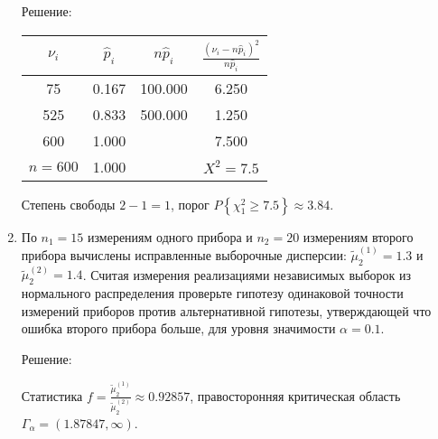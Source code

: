 \documentclass[a4paper,12pt]{article}
\newcommand{\probability}[1]{P \left\{ #1 \right\}}
\begin{document}
\begin{enumerate}
            Решение: \par
            \begin{tabular}{|c|c|c|c|}
                  \hline
                  $\nu_i$   & $\widehat{p}_i$ & $n \widehat{p}_i$ & $\frac{(\nu_i - n \widehat{p}_i)^2}{n \widehat{p}_i}$ \\
                  \hline
                  75        & 0.167           & 100.000           & 6.250                                                 \\
                  525       & 0.833           & 500.000           & 1.250                                                 \\
                  600       & 1.000           &                   & 7.500                                                 \\
                  \hline
                  $n = 600$ & 1.000           &                   & $X^2 = 7.5$                                           \\
                  \hline
            \end{tabular}

            Степень свободы $2 - 1 = 1$, порог $\probability{\chi_1^2 \ge 7.5} \approx 3.84$.

      \item По $n_1 = 15$ измерениям одного прибора и $n_2 = 20$ измерениям второго прибора вычислены исправленные выборочные дисперсии:
            $\widetilde{\mu}_2^{(1)} = 1.3$ и $\widetilde{\mu}_2^{(2)} = 1.4$. Считая измерения реализациями независимых выборок из нормального
            распределения проверьте гипотезу одинаковой точности измерений приборов против альтернативной гипотезы, утверждающей что ошибка второго
            прибора больше, для уровня значимости $\alpha = 0.1$.

            Решение: \par
            Статистика $f = \frac{\widetilde{\mu}_2^{(1)}}{\widetilde{\mu}_2^{(2)}} \approx 0.92857$, правосторонняя критическая область
            $\Gamma_\alpha = (1.87847, \infty)$.


\end{enumerate}
\end{document}

